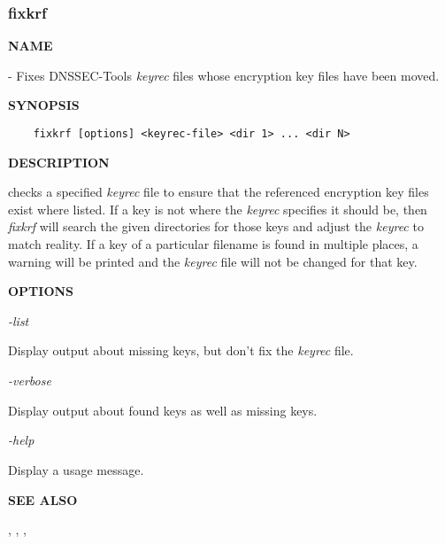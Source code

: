 \clearpage

\subsubsection{\bf fixkrf}


{\bf NAME}

 - Fixes DNSSEC-Tools {\it keyrec} files whose encryption
key files have been moved.

{\bf SYNOPSIS}

\begin{verbatim}
    fixkrf [options] <keyrec-file> <dir 1> ... <dir N>
\end{verbatim}

{\bf DESCRIPTION}

 checks a specified {\it keyrec} file to ensure that the
referenced encryption key files exist where listed.  If a key is not
where the {\it keyrec} specifies it should be, then {\it fixkrf} will
search the given directories for those keys and adjust the {\it keyrec}
to match reality.  If a key of a particular filename is found in multiple
places, a warning will be printed and the {\it keyrec} file will not be
changed for that key.

{\bf OPTIONS}

\begin{description}

\item {\it -list}\verb" "

Display output about missing keys, but don't fix the {\it keyrec} file.

\item {\it -verbose}\verb" "

Display output about found keys as well as missing keys.

\item {\it -help}\verb" "

Display a usage message.

\end{description}

{\bf SEE ALSO}

,
,
,


